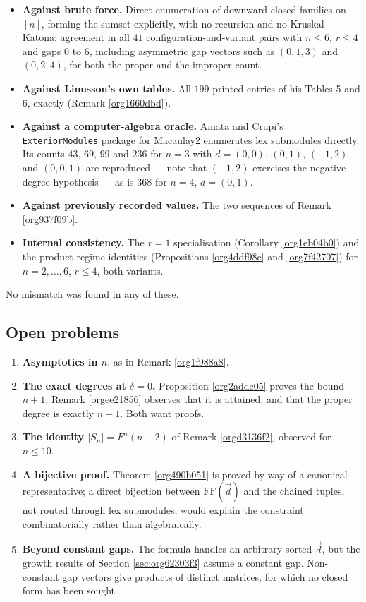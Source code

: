\documentclass[11pt, a4paper, abstract=yes]{scrartcl}
\theoremstyle{definition}
\theoremstyle{remark}
\theoremstyle{plain}
\newcommand{\vek}[1]{\boldsymbol{#1}}
\renewcommand{\vek}[1]{\vec{#1}}
\begin{document}
\begin{itemize}
\item \textbf{Against brute force.} Direct enumeration of downward-closed families on \([n]\), forming the
sumset explicitly, with no recursion and no Kruskal--Katona: agreement in all \(41\)
configuration-and-variant pairs with \(n\le6\), \(r\le4\) and gaps \(0\) to \(6\), including
asymmetric gap vectors such as \((0,1,3)\) and \((0,2,4)\), for both the proper and the improper
count.
\item \textbf{Against Linusson's own tables.} All \(199\) printed entries of his Tables 5 and 6, exactly
(Remark \ref{org1660dbd}).
\item \textbf{Against a computer-algebra oracle.} Amata and Crupi's \texttt{ExteriorModules} package for Macaulay2
enumerates lex submodules directly. Its counts \(43\), \(69\), \(99\) and \(236\) for \(n=3\) with
\(d=(0,0)\), \((0,1)\), \((-1,2)\) and \((0,0,1)\) are reproduced --- note that \((-1,2)\) exercises
the negative-degree hypothesis --- as is \(368\) for \(n=4\), \(d=(0,1)\).
\item \textbf{Against previously recorded values.} The two sequences of Remark \ref{org937f09b}.
\item \textbf{Internal consistency.} The \(r=1\) specialisation (Corollary \ref{org1eb04b0}) and the product-regime
identities (Propositions \ref{org4ddf98c} and \ref{org7f42707}) for \(n=2,\dots,6\),
\(r\le4\), both variants.
\end{itemize}

No mismatch was found in any of these.
\subsection{Open problems}
\label{sec:orgff6f035}

\begin{enumerate}
\item \textbf{Asymptotics in \(n\)}, as in Remark \ref{org1f988a8}.
\item \textbf{The exact degrees at \(\delta=0\).} Proposition \ref{org2adde05} proves the bound \(n+1\);
Remark \ref{orgee21856} observes that it is attained, and that the proper degree is exactly
\(n-1\). Both want proofs.
\item \textbf{The identity \(|S_n|=F^n(n-2)\)} of Remark \ref{orgd3136f2}, observed for \(n\le10\).
\item \textbf{A bijective proof.} Theorem \ref{org490b051} is proved by way of a canonical representative;
a direct bijection between \(\mathrm{FF}(\vek d)\) and the chained tuples, not routed through lex
submodules, would explain the constraint combinatorially rather than algebraically.
\item \textbf{Beyond constant gaps.} The formula handles an arbitrary sorted \(\vek d\), but the growth results of
Section \ref{sec:org62303f3} assume a constant gap. Non-constant gap vectors give products of distinct
matrices, for which no closed form has been sought.
\end{enumerate}
\end{document}
